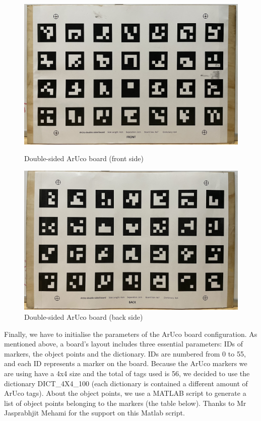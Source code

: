  \begin{figure}[ht]
 \centering
 \includegraphics[width=1\textwidth]{Images/Double-sided ArUco board (front side).jpg}
 \caption{Double-sided ArUco board (front side)}

 \vspace{10mm}

 \includegraphics[width=1\textwidth]{Images/Double-sided ArUco board (back side).jpg}
 \caption{Double-sided ArUco board (back side)}
 \end{figure}

\clearpage
Finally, we have to initialise the parameters of the ArUco board configuration. As mentioned above, a board's layout includes three essential parameters: IDs of markers, the object points and the dictionary. IDs are numbered from 0 to 55, and each ID represents a marker on the board. Because the ArUco markers we are using have a 4x4 size and the total of tags used is 56, we decided to use the dictionary DICT\_4X4\_100 (each dictionary is contained a different amount of ArUco tags). About the object points, we use a MATLAB script to generate a list of object points belonging to the markers (the table below). Thanks to Mr Jasprabhjit Mehami for the support on this Matlab script.

